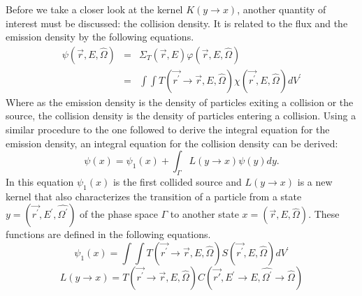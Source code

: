 Before we take a closer look at the kernel $K(y \to x)$, another quantity of 
interest must be discussed: the collision density. It is related to the
flux and the emission density by the following equations.
\begin{eqnarray}
  \psi(\vec{r},E,\hat{\Omega}) & = & \Sigma_T(\vec{r},E)
  \varphi(\vec{r},E,\hat{\Omega}) \\
  & = & \int\int T(\vec{r^{'}} \to \vec{r},E,\hat{\Omega})
  \chi(\vec{r^{'}},E,\hat{\Omega})dV^{'}
\end{eqnarray}
Where as the emission density is the density of particles exiting a collision
or the source, the collision density is the density of particles entering a 
collision. Using a similar procedure to the one followed to derive the 
integral equation for the emission density, an integral equation for the 
collision density can be derived:
\begin{equation*}
  \psi(x) = \psi_1(x) + \int_{\Gamma} L(y \to x)\psi(y)dy.
\end{equation*}
In this equation $\psi_1(x)$ is the first collided source and $L(y \to x)$ is
a new kernel that also characterizes the transition of a particle from a state 
$y = (\vec{r^{'}},E^{'},\hat{\Omega^{'}})$ of the phase space $\Gamma$ to another 
state $x = (\vec{r},E,\hat{\Omega})$. These functions are defined in the 
following equations.
\begin{equation}
  \psi_1(x) = \int\int T(\vec{r^{'}} \to \vec{r},E,\hat{\Omega})
  S(\vec{r^{'}},E,\hat{\Omega})dV^{'}
\end{equation}
\begin{equation}
  L(y \to x) =
  T(\vec{r^{'}} \to \vec{r},E,\hat{\Omega})
  C(\vec{r'},E^{'} \to E,\hat{\Omega^{'}} \to \hat{\Omega})
\end{equation}

